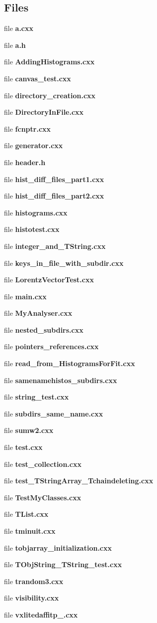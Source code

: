 \subsection*{Files}
\begin{CompactItemize}
\item 
file \textbf{a.cxx}
\item 
file \textbf{a.h}
\item 
file \textbf{Adding\-Histograms.cxx}
\item 
file \textbf{canvas\_\-test.cxx}
\item 
file \textbf{directory\_\-creation.cxx}
\item 
file \textbf{Directory\-In\-File.cxx}
\item 
file \textbf{fcnptr.cxx}
\item 
file \textbf{generator.cxx}
\item 
file \textbf{header.h}
\item 
file \textbf{hist\_\-diff\_\-files\_\-part1.cxx}
\item 
file \textbf{hist\_\-diff\_\-files\_\-part2.cxx}
\item 
file \textbf{histograms.cxx}
\item 
file \textbf{histotest.cxx}
\item 
file \textbf{integer\_\-and\_\-TString.cxx}
\item 
file \textbf{keys\_\-in\_\-file\_\-with\_\-subdir.cxx}
\item 
file \textbf{Lorentz\-Vector\-Test.cxx}
\item 
file \textbf{main.cxx}
\item 
file \textbf{My\-Analyser.cxx}
\item 
file \textbf{nested\_\-subdirs.cxx}
\item 
file \textbf{pointers\_\-references.cxx}
\item 
file \textbf{read\_\-from\_\-Histograms\-For\-Fit.cxx}
\item 
file \textbf{samenamehistos\_\-subdirs.cxx}
\item 
file \textbf{string\_\-test.cxx}
\item 
file \textbf{subdirs\_\-same\_\-name.cxx}
\item 
file \textbf{sumw2.cxx}
\item 
file \textbf{test.cxx}
\item 
file \textbf{test\_\-collection.cxx}
\item 
file \textbf{test\_\-TString\-Array\_\-Tchaindeleting.cxx}
\item 
file \textbf{Test\-My\-Classes.cxx}
\item 
file \textbf{TList.cxx}
\item 
file \textbf{tminuit.cxx}
\item 
file \textbf{tobjarray\_\-initialization.cxx}
\item 
file \textbf{TObj\-String\_\-TString\_\-test.cxx}
\item 
file \textbf{trandom3.cxx}
\item 
file \textbf{visibility.cxx}
\item 
file \textbf{vxlitedaffitp\_\-.cxx}
\end{CompactItemize}
